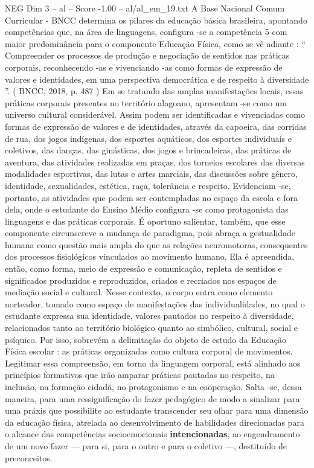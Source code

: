 \begin{textsample}{NEG Dim 3 – al – Score -1.00 – al/al\_em\_19.txt}
A Base Nacional Comum Curricular - BNCC determina os pilares da educação básica brasileira, apontando competências que, na área de linguagens, configura -se a competência 5 com maior predominância para o componente Educação Física, como se vê adiante : “ Compreender os processos de produção e negociação de sentidos nas práticas corporais, reconhecendo -as e vivenciando -as como formas de expressão de valores e identidades, em uma perspectiva democrática e de respeito à diversidade ”. ( BNCC, 2018, p. 487 ) Em se tratando das amplas manifestações locais, essas práticas corporais presentes no território alagoano, apresentam -se como um universo cultural considerável.
Assim podem ser identificadas e vivenciadas como formas de expressão de valores e de identidades, através da capoeira, das corridas de rua, dos jogos indígenas, dos esportes aquáticos, dos esportes individuais e coletivos, das danças, das ginásticas, dos jogos e brincadeiras, das práticas de aventura, das atividades realizadas em praças, dos torneios escolares das diversas modalidades esportivas, das lutas e artes marciais, das discussões sobre gênero, identidade, sexualidades, estética, raça, tolerância e respeito.
Evidenciam -se, portanto, as atividades que podem ser contempladas no espaço da escola e fora dela, onde o estudante do Ensino Médio configura -se como protagonista das linguagens e das práticas corporais.
É oportuno salientar, também, que esse componente circunscreve a mudança de paradigma, pois abraça a gestualidade humana como questão mais ampla do que as relações neuromotoras, consequentes dos processos fisiológicos vinculados ao movimento humano.
Ela é apreendida, então, como forma, meio de expressão e comunicação, repleta de sentidos e significados produzidos e reproduzidos, criados e recriados nos espaços de mediação social e cultural.
Nesse contexto, o corpo entra como elemento norteador, tomado como espaço de manifestações das individualidades, no qual o estudante expressa sua identidade, valores pautados no respeito à diversidade, relacionados tanto ao território biológico quanto ao simbólico, cultural, social e psíquico.
Por isso, sobrevém a delimitação do objeto de estudo da Educação Física escolar : as práticas organizadas como cultura corporal de movimentos.
Legitimar essa compreensão, em torno da linguagem corporal, está alinhado aos princípios formativos que irão amparar práticas pautadas no respeito, na inclusão, na formação cidadã, no protagonismo e na cooperação.
Salta -se, dessa maneira, para uma ressignificação do fazer pedagógico de modo a sinalizar para uma práxis que possibilite ao estudante transcender seu olhar para uma dimensão da educação física, atrelada ao desenvolvimento de habilidades direcionadas para o alcance das competências socioemocionais \textbf{intencionadas}, ao engendramento de um novo fazer — para si, para o outro e para o coletivo —, destituído de preconceitos.

\end{textsample}
